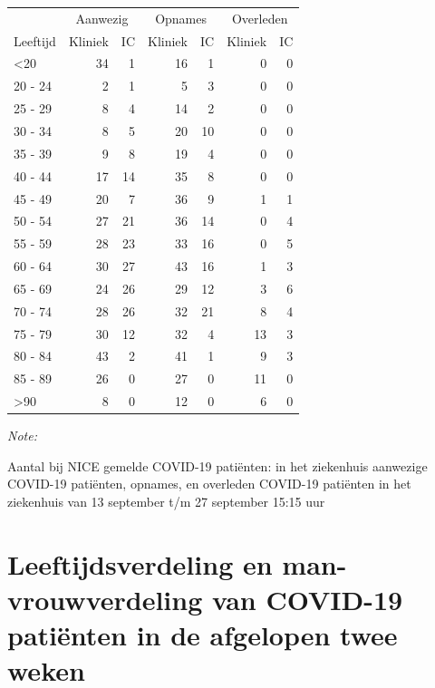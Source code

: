 \documentclass[
  english,
  man,floatsintext]{apa6}
\begin{document}
\begin{table}
\centering\begingroup\fontsize{10}{12}\selectfont

\begin{threeparttable}
\begin{tabular}{lrrrrrr}
\toprule
\multicolumn{1}{c}{ } & \multicolumn{2}{c}{Aanwezig} & \multicolumn{2}{c}{Opnames} & \multicolumn{2}{c}{Overleden} \\
\cmidrule(l{3pt}r{3pt}){2-3} \cmidrule(l{3pt}r{3pt}){4-5} \cmidrule(l{3pt}r{3pt}){6-7}
Leeftijd & Kliniek & IC & Kliniek & IC & Kliniek & IC\\
\midrule
<20 & 34 & 1 & 16 & 1 & 0 & 0\\
20 - 24 & 2 & 1 & 5 & 3 & 0 & 0\\
25 - 29 & 8 & 4 & 14 & 2 & 0 & 0\\
30 - 34 & 8 & 5 & 20 & 10 & 0 & 0\\
35 - 39 & 9 & 8 & 19 & 4 & 0 & 0\\
40 - 44 & 17 & 14 & 35 & 8 & 0 & 0\\
45 - 49 & 20 & 7 & 36 & 9 & 1 & 1\\
50 - 54 & 27 & 21 & 36 & 14 & 0 & 4\\
55 - 59 & 28 & 23 & 33 & 16 & 0 & 5\\
60 - 64 & 30 & 27 & 43 & 16 & 1 & 3\\
65 - 69 & 24 & 26 & 29 & 12 & 3 & 6\\
70 - 74 & 28 & 26 & 32 & 21 & 8 & 4\\
75 - 79 & 30 & 12 & 32 & 4 & 13 & 3\\
80 - 84 & 43 & 2 & 41 & 1 & 9 & 3\\
85 - 89 & 26 & 0 & 27 & 0 & 11 & 0\\
>90 & 8 & 0 & 12 & 0 & 6 & 0\\
\bottomrule
\end{tabular}
\begin{tablenotes}
\item \textit{Note: } 
\item Aantal bij NICE gemelde COVID-19 patiënten: in het ziekenhuis aanwezige COVID-19 patiënten, opnames, en overleden COVID-19 patiënten in het ziekenhuis van 13 september t/m 27 september 15:15 uur
\end{tablenotes}
\end{threeparttable}
\endgroup{}
\end{table}

\newpage

\hypertarget{leeftijdsverdeling-en-man-vrouwverdeling-van-covid-19-patiuxebnten-in-de-afgelopen-twee-weken}{%
\section{Leeftijdsverdeling en man-vrouwverdeling van COVID-19 patiënten in de afgelopen twee weken}\label{leeftijdsverdeling-en-man-vrouwverdeling-van-covid-19-patiuxebnten-in-de-afgelopen-twee-weken}}
\end{document}
